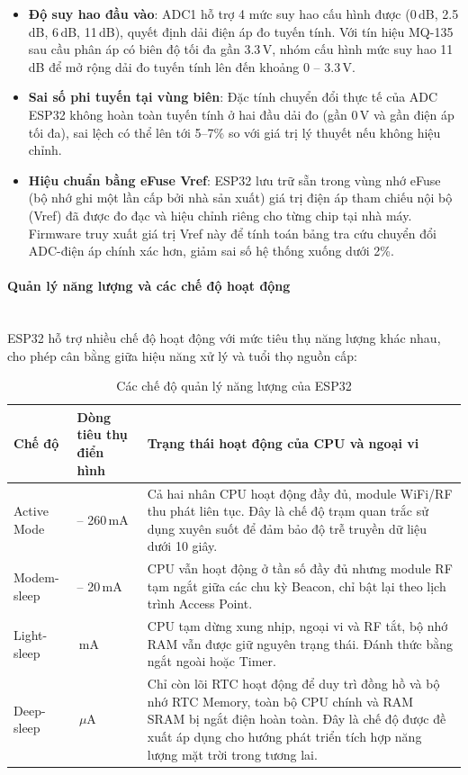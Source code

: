 \documentclass[12pt,a4paper]{article}
\begin{document}
\begin{itemize}
    \item \textbf{Độ suy hao đầu vào}: ADC1 hỗ trợ 4 mức suy hao cấu hình được (0\,dB, 2.5\,dB, 6\,dB, 11\,dB), quyết định dải điện áp đo tuyến tính. Với tín hiệu MQ-135 sau cầu phân áp có biên độ tối đa gần 3.3\,V, nhóm cấu hình mức suy hao 11\,dB để mở rộng dải đo tuyến tính lên đến khoảng 0 -- 3.3\,V.
    \item \textbf{Sai số phi tuyến tại vùng biên}: Đặc tính chuyển đổi thực tế của ADC ESP32 không hoàn toàn tuyến tính ở hai đầu dải đo (gần 0\,V và gần điện áp tối đa), sai lệch có thể lên tới 5--7\% so với giá trị lý thuyết nếu không hiệu chỉnh.
    \item \textbf{Hiệu chuẩn bằng eFuse Vref}: ESP32 lưu trữ sẵn trong vùng nhớ eFuse (bộ nhớ ghi một lần cấp bởi nhà sản xuất) giá trị điện áp tham chiếu nội bộ (Vref) đã được đo đạc và hiệu chỉnh riêng cho từng chip tại nhà máy. Firmware truy xuất giá trị Vref này để tính toán bảng tra cứu chuyển đổi ADC-điện áp chính xác hơn, giảm sai số hệ thống xuống dưới 2\%.
\end{itemize}

\paragraph{Quản lý năng lượng và các chế độ hoạt động}\mbox{}\\

ESP32 hỗ trợ nhiều chế độ hoạt động với mức tiêu thụ năng lượng khác nhau, cho phép cân bằng giữa hiệu năng xử lý và tuổi thọ nguồn cấp:

\begin{table}[H]
\centering\small
\caption{Các chế độ quản lý năng lượng của ESP32}
\label{tab:power_modes}
\begin{tabular}{|>{\raggedright\arraybackslash}p{3.0cm}|>{\raggedright\arraybackslash}p{3.0cm}|>{\raggedright\arraybackslash}p{6.2cm}|}
\hline
\textbf{Chế độ} & \textbf{Dòng tiêu thụ điển hình} & \textbf{Trạng thái hoạt động của CPU và ngoại vi} \\ 
        \hline
Active Mode & 80 -- 260\,mA & Cả hai nhân CPU hoạt động đầy đủ, module WiFi/RF thu phát liên tục. Đây là chế độ trạm quan trắc sử dụng xuyên suốt để đảm bảo độ trễ truyền dữ liệu dưới 10 giây. \\ 
        \hline
Modem-sleep & 3 -- 20\,mA & CPU vẫn hoạt động ở tần số đầy đủ nhưng module RF tạm ngắt giữa các chu kỳ Beacon, chỉ bật lại theo lịch trình Access Point. \\ 
        \hline
Light-sleep & 0.8\,mA & CPU tạm dừng xung nhịp, ngoại vi và RF tắt, bộ nhớ RAM vẫn được giữ nguyên trạng thái. Đánh thức bằng ngắt ngoài hoặc Timer. \\ 
        \hline
Deep-sleep & 10\,$\mu$A & Chỉ còn lõi RTC hoạt động để duy trì đồng hồ và bộ nhớ RTC Memory, toàn bộ CPU chính và RAM SRAM bị ngắt điện hoàn toàn. Đây là chế độ được đề xuất áp dụng cho hướng phát triển tích hợp năng lượng mặt trời trong tương lai. \\ 
        \hline\end{tabular}
\end{table}
\end{document}

